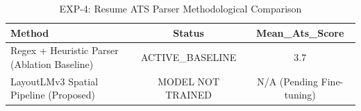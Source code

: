 \begin{table}[htbp]
\centering
\caption{EXP-4: Resume ATS Parser Methodological Comparison}
\label{tab:exp4_ats_ablation}
\begin{tabular}{lcc}
\toprule
Method & Status & Mean\_Ats\_Score \\
\midrule
Regex + Heuristic Parser (Ablation Baseline) & ACTIVE_BASELINE & 3.7 \\
LayoutLMv3 Spatial Pipeline (Proposed) & MODEL NOT TRAINED & N/A (Pending Fine-tuning) \\
\bottomrule
\end{tabular}
\end{table}
